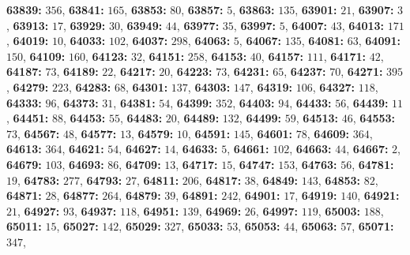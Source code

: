 \textsf{\bfseries 63839:} $356$, \textsf{\bfseries 63841:} $165$, \textsf{\bfseries 63853:} $80$, \textsf{\bfseries 63857:} $5$, \textsf{\bfseries 63863:} $135$, \textsf{\bfseries 63901:} $21$, \textsf{\bfseries 63907:} $3$, \textsf{\bfseries 63913:} $17$, \textsf{\bfseries 63929:} $30$, \textsf{\bfseries 63949:} $44$, \textsf{\bfseries 63977:} $35$, \textsf{\bfseries 63997:} $5$, \textsf{\bfseries 64007:} $43$, \textsf{\bfseries 64013:} $171$, \textsf{\bfseries 64019:} $10$, \textsf{\bfseries 64033:} $102$, \textsf{\bfseries 64037:} $298$, \textsf{\bfseries 64063:} $5$, \textsf{\bfseries 64067:} $135$, \textsf{\bfseries 64081:} $63$, \textsf{\bfseries 64091:} $150$, \textsf{\bfseries 64109:} $160$, \textsf{\bfseries 64123:} $32$, \textsf{\bfseries 64151:} $258$, \textsf{\bfseries 64153:} $40$, \textsf{\bfseries 64157:} $111$, \textsf{\bfseries 64171:} $42$, \textsf{\bfseries 64187:} $73$, \textsf{\bfseries 64189:} $22$, \textsf{\bfseries 64217:} $20$, \textsf{\bfseries 64223:} $73$, \textsf{\bfseries 64231:} $65$, \textsf{\bfseries 64237:} $70$, \textsf{\bfseries 64271:} $395$, \textsf{\bfseries 64279:} $223$, \textsf{\bfseries 64283:} $68$, \textsf{\bfseries 64301:} $137$, \textsf{\bfseries 64303:} $147$, \textsf{\bfseries 64319:} $106$, \textsf{\bfseries 64327:} $118$, \textsf{\bfseries 64333:} $96$, \textsf{\bfseries 64373:} $31$, \textsf{\bfseries 64381:} $54$, \textsf{\bfseries 64399:} $352$, \textsf{\bfseries 64403:} $94$, \textsf{\bfseries 64433:} $56$, \textsf{\bfseries 64439:} $11$, \textsf{\bfseries 64451:} $88$, \textsf{\bfseries 64453:} $55$, \textsf{\bfseries 64483:} $20$, \textsf{\bfseries 64489:} $132$, \textsf{\bfseries 64499:} $59$, \textsf{\bfseries 64513:} $46$, \textsf{\bfseries 64553:} $73$, \textsf{\bfseries 64567:} $48$, \textsf{\bfseries 64577:} $13$, \textsf{\bfseries 64579:} $10$, \textsf{\bfseries 64591:} $145$, \textsf{\bfseries 64601:} $78$, \textsf{\bfseries 64609:} $364$, \textsf{\bfseries 64613:} $364$, \textsf{\bfseries 64621:} $54$, \textsf{\bfseries 64627:} $14$, \textsf{\bfseries 64633:} $5$, \textsf{\bfseries 64661:} $102$, \textsf{\bfseries 64663:} $44$, \textsf{\bfseries 64667:} $2$, \textsf{\bfseries 64679:} $103$, \textsf{\bfseries 64693:} $86$, \textsf{\bfseries 64709:} $13$, \textsf{\bfseries 64717:} $15$, \textsf{\bfseries 64747:} $153$, \textsf{\bfseries 64763:} $56$, \textsf{\bfseries 64781:} $19$, \textsf{\bfseries 64783:} $277$, \textsf{\bfseries 64793:} $27$, \textsf{\bfseries 64811:} $206$, \textsf{\bfseries 64817:} $38$, \textsf{\bfseries 64849:} $143$, \textsf{\bfseries 64853:} $82$, \textsf{\bfseries 64871:} $28$, \textsf{\bfseries 64877:} $264$, \textsf{\bfseries 64879:} $39$, \textsf{\bfseries 64891:} $242$, \textsf{\bfseries 64901:} $17$, \textsf{\bfseries 64919:} $140$, \textsf{\bfseries 64921:} $21$, \textsf{\bfseries 64927:} $93$, \textsf{\bfseries 64937:} $118$, \textsf{\bfseries 64951:} $139$, \textsf{\bfseries 64969:} $26$, \textsf{\bfseries 64997:} $119$, \textsf{\bfseries 65003:} $188$, \textsf{\bfseries 65011:} $15$, \textsf{\bfseries 65027:} $142$, \textsf{\bfseries 65029:} $327$, \textsf{\bfseries 65033:} $53$, \textsf{\bfseries 65053:} $44$, \textsf{\bfseries 65063:} $57$, \textsf{\bfseries 65071:} $347$, 
